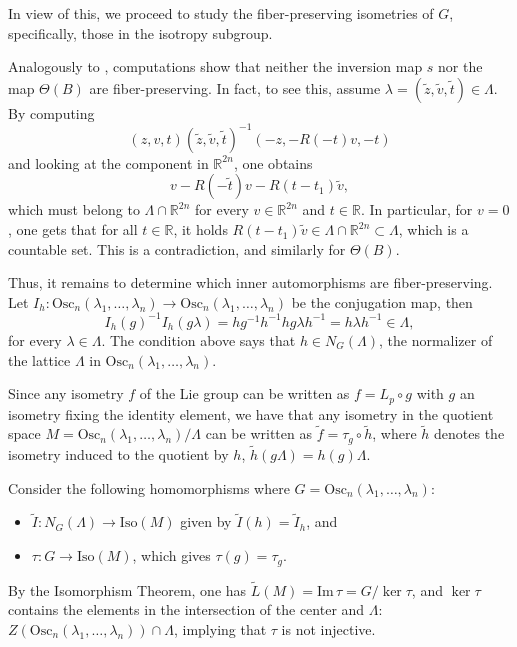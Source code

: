 \documentclass[12pt]{amsart}
\theoremstyle{plain}
\theoremstyle{definition}
\theoremstyle{remark}
\begin{document}
In view of this, we proceed to study the fiber-preserving isometries of \( G \), specifically, those in the isotropy subgroup.

Analogously to \cite{BOV}, computations show that neither the inversion map \( s \) nor the map \( \Theta(B) \) are fiber-preserving. In fact, to see this, assume \( \lambda = (\tilde{z}, \tilde{v}, \tilde{t}) \in \Lambda \). By computing 
\[
(z, v, t)(\tilde{z}, \tilde{v}, \tilde{t})^{-1}(-z, -R(-t)v, -t)
\]
and looking at the component in \( \mathbb{R}^{2n} \), one obtains 
\[
v - R(-\tilde{t})v - R(t-t_1)\tilde{v},
\]
which must belong to \( \Lambda \cap \mathbb{R}^{2n} \) for every \( v \in \mathbb{R}^{2n} \) and \( t \in \mathbb{R} \). In particular, for \( v = 0 \), one gets that for all \( t \in \mathbb{R} \), it holds \( R(t-t_1)\tilde{v} \in \Lambda \cap \mathbb{R}^{2n} \subset \Lambda \), which is a countable set. This is a contradiction, and similarly for \( \Theta(B) \).

Thus, it remains to determine which inner automorphisms are fiber-preserving. Let \( I_h: \text{Osc}_n(\lambda_1, \ldots, \lambda_n) \to \text{Osc}_n(\lambda_1, \ldots, \lambda_n) \) be the conjugation map, then
\[
I_h(g)^{-1}I_h(g\lambda) = hg^{-1}h^{-1} hg\lambda h^{-1} = h\lambda h^{-1} \in \Lambda,
\]
for every \( \lambda \in \Lambda \). The condition above says that  
\( h \in N_G(\Lambda) \), the normalizer of the lattice \( \Lambda \) in \( \text{Osc}_n(\lambda_1, \ldots, \lambda_n) \).

Since any isometry \( f \) of the Lie group can be written as \( f = L_p \circ g \) with \( g \) an isometry fixing the identity element, we have that any isometry in the quotient space \( M = \text{Osc}_n(\lambda_1, \ldots, \lambda_n)/\Lambda \) can be written as \( \tilde{f} = \tau_g \circ \tilde{h} \), where \( \tilde{h} \) denotes the isometry induced to the quotient by \( h \), \( \tilde{h}(g\Lambda) = h(g)\Lambda \).
 



Consider the following homomorphisms where \( G = \text{Osc}_n(\lambda_1, \ldots, \lambda_n) \):
\begin{itemize}
    \item \( \widetilde{I}: N_G(\Lambda) \to \text{Iso}(M) \) given by \( \widetilde{I}(h) = \widetilde{I}_h \), and
    \item \( \tau: G \to \text{Iso}(M) \), which gives \( \tau(g) = \tau_g \).
\end{itemize}

By the Isomorphism Theorem, one has \( \tilde{L}(M) = \text{Im}\,\tau = G/\ker\tau \), and \( \ker\tau \) contains the elements in the intersection of the center and \( \Lambda \): \( Z(\text{Osc}_n(\lambda_1, \ldots, \lambda_n)) \cap \Lambda \), implying that \( \tau \) is not injective.
\end{document}
